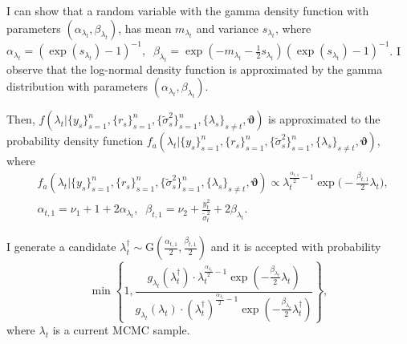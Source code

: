 \documentclass[11pt]{article}
\begin{document}
I can show that a random variable with the gamma density function with parameters $(\alpha_{\lambda_t}, \beta_{\lambda_t})$, 
has mean $m_{\lambda_t}$ and variance $s_{\lambda_t}$, 
where $\alpha_{\lambda_t} =(\exp(s_{\lambda_t})-1)^{-1}, \;\; \beta_{\lambda_t} =\exp(-m_{\lambda_t}-\frac{1}{2}s_{\lambda_t}) (\exp(s_{\lambda_t})-1)^{-1}$. 
I observe that the log-normal density function is approximated by the gamma distribution with parameters $(\alpha_{\lambda_t}, \beta_{\lambda_t})$.

Then, $f(\lambda_{t} |\{y_s\}_{s=1}^n, \{r_s\}_{s=1}^n, \{\widetilde{\sigma}^2_{s}\}_{s=1}^n, \{\lambda_{s}\}_{s\neq t}, \bm{\vartheta})$ is approximated to the probability density function 
$f_a(\lambda_{t} |\{y_s\}_{s=1}^n, \{r_s\}_{s=1}^n, \{\widetilde{\sigma}^2_{s}\}_{s=1}^n, \{\lambda_{s}\}_{s\neq t}, \bm{\vartheta})$, where
\begin{align}
&f_a(\lambda_{t} |\{y_s\}_{s=1}^n, \{r_s\}_{s=1}^n, \{\widetilde{\sigma}^2_{s}\}_{s=1}^n, \{\lambda_{s}\}_{s\neq t}, \bm{\vartheta}) 
\propto 
\lambda_t^{\frac{\alpha_{t,1}}{2}-1}\exp\bigg( -\frac{\beta_{t, 1}}{2}\lambda_t \bigg), \\
&\alpha_{t,1}= \nu_1 +1 +2\alpha_{\lambda_t}, \;\; \beta_{t, 1} =\nu_2 + \frac{y_t^2}{\widetilde{\sigma}^2_t} +2\beta_{\lambda_t}. 
\end{align}

I generate a candidate $\lambda_t^\dagger \sim \mathrm{G}(\frac{\alpha_{t, 1}}{2}, \frac{\beta_{t, 1}}{2})$ and it is accepted with probability
\begin{equation}
\min\left\{ 1, \frac{g_{\lambda_t}(\lambda_{t}^\dagger ) \cdot \lambda_t^{\frac{\alpha_{\lambda_t}}{2}-1}\exp(-\frac{\beta_{\lambda_t}}{2}\lambda_t)}{g_{\lambda_t}(\lambda_{t} ) \cdot (\lambda_t^\dagger)^{\frac{\alpha_{\lambda_t}}{2}-1}\exp(-\frac{\beta_{\lambda_t}}{2}\lambda_t^\dagger)} \right\}, 
\end{equation}
where $\lambda_t$ is a current MCMC sample. 
\end{document}
